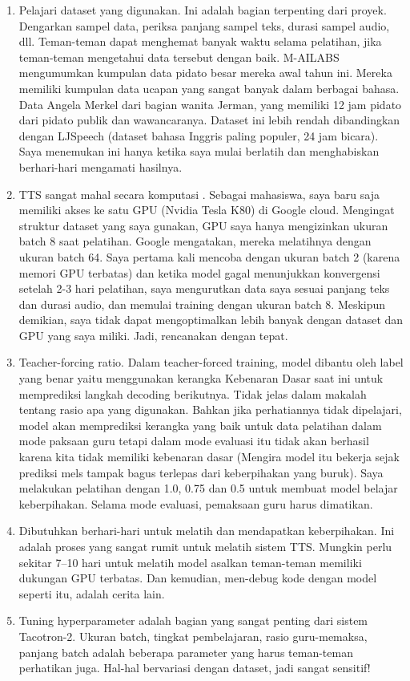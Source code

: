 \begin{enumerate}
\item Pelajari dataset yang digunakan. Ini adalah bagian terpenting dari proyek. Dengarkan sampel data, periksa panjang sampel teks, durasi sampel audio, dll. Teman-teman dapat menghemat banyak waktu selama pelatihan, jika teman-teman mengetahui data tersebut dengan baik. M-AILABS mengumumkan kumpulan data pidato besar mereka awal tahun ini. Mereka memiliki kumpulan data ucapan yang sangat banyak dalam berbagai bahasa. Data Angela Merkel dari bagian wanita Jerman, yang memiliki 12 jam pidato dari pidato publik dan wawancaranya. Dataset ini lebih rendah dibandingkan dengan LJSpeech (dataset bahasa Inggris paling populer, 24 jam bicara). Saya menemukan ini hanya ketika saya mulai berlatih dan menghabiskan berhari-hari mengamati hasilnya.

\item TTS sangat mahal secara komputasi . Sebagai mahasiswa, saya baru saja memiliki akses ke satu GPU (Nvidia Tesla K80) di Google cloud. Mengingat struktur dataset yang saya gunakan, GPU saya hanya mengizinkan ukuran batch 8 saat pelatihan. Google mengatakan, mereka melatihnya dengan ukuran batch 64. Saya pertama kali mencoba dengan ukuran batch 2 (karena memori GPU terbatas) dan ketika model gagal menunjukkan konvergensi setelah 2-3 hari pelatihan, saya mengurutkan data saya sesuai panjang teks dan durasi audio, dan memulai training dengan ukuran batch 8. Meskipun demikian, saya tidak dapat mengoptimalkan lebih banyak dengan dataset dan GPU yang saya miliki. Jadi, rencanakan dengan tepat.

\item Teacher-forcing ratio. Dalam teacher-forced training, model dibantu oleh label yang benar yaitu menggunakan kerangka Kebenaran Dasar saat ini untuk memprediksi langkah decoding berikutnya. Tidak jelas dalam makalah tentang rasio apa yang digunakan. Bahkan jika perhatiannya tidak dipelajari, model akan memprediksi kerangka yang baik untuk data pelatihan dalam mode paksaan guru tetapi dalam mode evaluasi itu tidak akan berhasil karena kita tidak memiliki kebenaran dasar (Mengira model itu bekerja sejak prediksi mels tampak bagus terlepas dari keberpihakan yang buruk). Saya melakukan pelatihan dengan 1.0, 0.75 dan 0.5 untuk membuat model belajar keberpihakan. Selama mode evaluasi, pemaksaan guru harus dimatikan.

\item Dibutuhkan berhari-hari untuk melatih dan mendapatkan keberpihakan. Ini adalah proses yang sangat rumit untuk melatih sistem TTS. Mungkin perlu sekitar 7–10 hari untuk melatih model asalkan teman-teman memiliki dukungan GPU terbatas. Dan kemudian, men-debug kode dengan model seperti itu, adalah cerita lain.

\item Tuning hyperparameter adalah bagian yang sangat penting dari sistem Tacotron-2. Ukuran batch, tingkat pembelajaran, rasio guru-memaksa, panjang batch adalah beberapa parameter yang harus teman-teman perhatikan juga. Hal-hal bervariasi dengan dataset, jadi sangat sensitif!
\end{enumerate}


